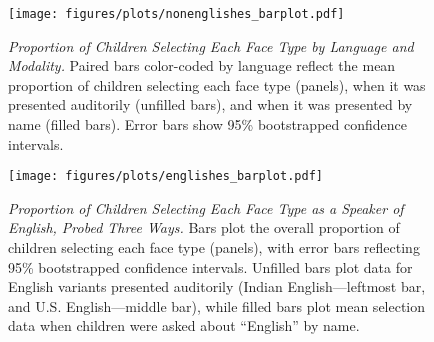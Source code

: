 \documentclass[11pt, floatsintext]{article}
\begin{document}







\begin{figure}[H]
    \centering
    \texttt{[image: figures/plots/nonenglishes\_barplot.pdf]}
    \caption{\textit{Proportion of Children Selecting Each Face Type by Language and Modality.} 
    Paired bars color-coded by language reflect the mean proportion of children selecting each face type (panels), when it was presented auditorily (unfilled bars), and when it was presented by name (filled bars). 
    Error bars show 95\% bootstrapped confidence intervals.}
    \label{fig:nonenglangs}
\end{figure}
%
\begin{figure}[H]
    \centering
    \texttt{[image: figures/plots/englishes\_barplot.pdf]}
    \caption{\textit{Proportion of Children Selecting Each Face Type as a Speaker of English, Probed Three Ways.} 
    Bars plot the overall proportion of children selecting each face type (panels), with error bars reflecting 95\% bootstrapped confidence intervals. Unfilled bars plot data for English variants presented auditorily (Indian English---leftmost bar, and U.S. English---middle bar), while filled bars plot mean selection data when children were asked about ``English'' by name.}    %
    \label{fig:englishes}
\end{figure}








%
%
%
%
\end{document}

